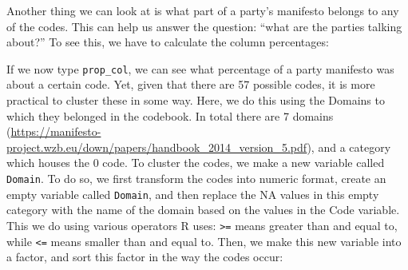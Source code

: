 \documentclass[
]{book}
\newenvironment{Shaded}{\begin{snugshade}}{\end{snugshade}}
\newcommand{\DecValTok}[1]{\textcolor[rgb]{0.00,0.00,0.81}{#1}}
\newcommand{\FunctionTok}[1]{\textcolor[rgb]{0.00,0.00,0.00}{#1}}
\newcommand{\NormalTok}[1]{#1}
\newcommand{\OtherTok}[1]{\textcolor[rgb]{0.56,0.35,0.01}{#1}}
\newcommand{\SpecialCharTok}[1]{\textcolor[rgb]{0.00,0.00,0.00}{#1}}
\newcommand{\StringTok}[1]{\textcolor[rgb]{0.31,0.60,0.02}{#1}}
\begin{document}
Another thing we can look at is what part of a party's manifesto belongs to any of the codes. This can help us answer the question: ``what are the parties talking about?'' To see this, we have to calculate the column percentages:

\begin{Shaded}
\end{Shaded}

If we now type \texttt{prop\_col}, we can see what percentage of a party manifesto was about a certain code. Yet, given that there are 57 possible codes, it is more practical to cluster these in some way. Here, we do this using the Domains to which they belonged in the codebook. In total there are 7 domains (\url{https://manifesto-project.wzb.eu/down/papers/handbook_2014_version_5.pdf}), and a category which houses the 0 code. To cluster the codes, we make a new variable called \texttt{Domain}. To do so, we first transform the codes into numeric format, create an empty variable called \texttt{Domain}, and then replace the NA values in this empty category with the name of the domain based on the values in the Code variable. This we do using various operators R uses: \texttt{\textgreater{}=} means greater than and equal to, while \texttt{\textless{}=} means smaller than and equal to. Then, we make this new variable into a factor, and sort this factor in the way the codes occur:
\end{document}
